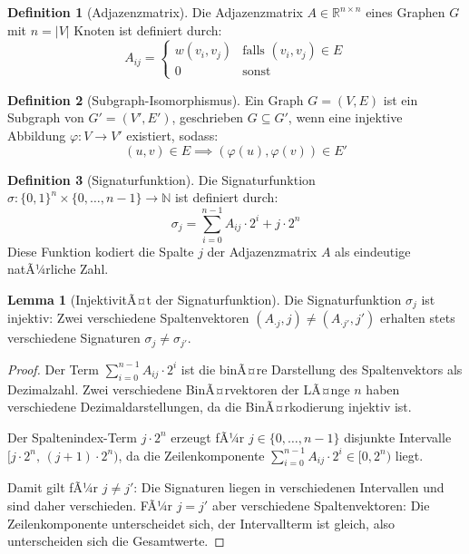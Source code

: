 ﻿\documentclass[a4paper,12pt]{article}
\theoremstyle{definition}
\newtheorem{definition}{Definition}
\newtheorem{lemma}{Lemma}
\begin{document}
\begin{definition}[Adjazenzmatrix]
	Die Adjazenzmatrix $A \in \mathbb{R}^{n \times n}$ eines Graphen $G$ mit
	$n = |V|$ Knoten ist definiert durch:
	\[
	A_{ij} = \begin{cases}
		w(v_i, v_j) & \text{falls } (v_i, v_j) \in E \\
		0 & \text{sonst}
	\end{cases}
	\]
\end{definition}

\begin{definition}[Subgraph-Isomorphismus]
	Ein Graph $G = (V, E)$ ist ein Subgraph von $G' = (V', E')$,
	geschrieben $G \subseteq G'$, wenn eine injektive Abbildung
	$\varphi: V \to V'$ existiert, sodass:
	\[
	(u, v) \in E \implies (\varphi(u), \varphi(v)) \in E'
	\]
\end{definition}

\begin{definition}[Signaturf\/unktion]
	Die Signaturfunktion $\sigma: \{0,1\}^n \times \{0,\ldots,n-1\} \to \mathbb{N}$
	ist definiert durch:
	\[
	\sigma_j = \sum_{i=0}^{n-1} A_{ij} \cdot 2^i + j \cdot 2^n
	\]
	Diese Funktion kodiert die Spalte $j$ der Adjazenzmatrix $A$ als eindeutige
	natÃ¼rliche Zahl.
\end{definition}

\begin{lemma}[InjektivitÃ¤t der Signaturfunktion]
\label{lem:injektiv}
	Die Signaturfunktion $\sigma_j$ ist injektiv: Zwei verschiedene
	Spaltenvektoren $(A_{\cdot j}, j) \neq (A_{\cdot j'}, j')$ erhalten
	stets verschiedene Signaturen $\sigma_j \neq \sigma_{j'}$.
\end{lemma}

\begin{proof}
	Der Term $\sum_{i=0}^{n-1} A_{ij} \cdot 2^i$ ist die binÃ¤re Darstellung
	des Spaltenvektors als Dezimalzahl. Zwei verschiedene BinÃ¤rvektoren der
	LÃ¤nge $n$ haben verschiedene Dezimaldarstellungen, da die BinÃ¤rkodierung
	injektiv ist.

	Der Spaltenindex-Term $j \cdot 2^n$ erzeugt fÃ¼r $j \in \{0,\ldots,n-1\}$
	disjunkte Intervalle $[j \cdot 2^n,\, (j+1) \cdot 2^n)$, da die
	Zeilenkomponente $\sum_{i=0}^{n-1} A_{ij} \cdot 2^i \in [0, 2^n)$ liegt.

	Damit gilt fÃ¼r $j \neq j'$: Die Signaturen liegen in verschiedenen
	Intervallen und sind daher verschieden. FÃ¼r $j = j'$ aber verschiedene
	Spaltenvektoren: Die Zeilenkomponente unterscheidet sich, der Intervallterm
	ist gleich, also unterscheiden sich die Gesamtwerte.
\end{proof}
\end{document}
